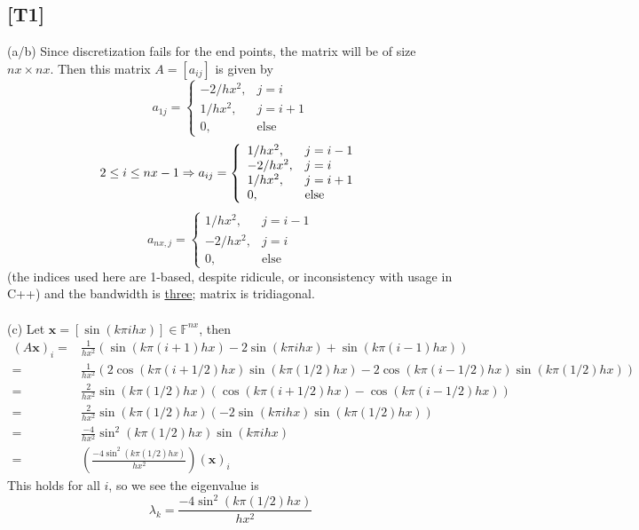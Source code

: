\documentclass[12pt,a4paper]{article}
\newcommand{\ra}[1]{\ifnum #1=1\rightarrow\fi\ifnum #1=2\Rightarrow\fi}
\newcommand{\bga}{\begin{align*}}
\renewcommand{\l}{\left}\renewcommand{\r}{\right}
\newcommand{\x}{\times}
\newcommand{\F}{\mathbb F}
\def\vx{\mathbf x}
\begin{document}
\subsection*{[T1]}
(a/b) Since discretization fails for the end points, the matrix will be of size $nx\x nx$. Then this matrix $A = [a_{ij}]$ is given by 
$$a_{1j} = \l\{\begin{array}{ll}
-2/hx^2, &j=i\\
1/hx^2, &j=i+1\\
0, &\text{else}
\end{array}\r.$$
$$2 \leq i \leq nx-1 \ra2 a_{ij} = \l\{\begin{array}{ll}
1/hx^2, &j=i-1\\
-2/hx^2, &j=i\\
1/hx^2, &j=i+1\\
0, &\text{else}
\end{array}\r.$$
$$a_{nx,j} = \l\{\begin{array}{ll}
1/hx^2, &j=i-1\\
-2/hx^2, &j=i\\
0, &\text{else}
\end{array}\r.$$
(the indices used here are 1-based, despite ridicule, or inconsistency with usage in C++) and the bandwidth is \underline{three}; matrix is tridiagonal. \\
\\
(c) Let $\vx = [\sin(k\pi i hx)] \in \F^{nx}$, then
\bga
(A\vx)_i 
= & \frac1{hx^2}\l(\sin(k\pi (i+1)hx) - 2\sin(k\pi ihx) + \sin(k\pi(i-1)hx)\r)\\
= & \frac1{hx^2 }\l(  2\cos(k\pi (i+1/2) hx)\sin(k\pi (1/2) hx) - 2\cos(k\pi (i-1/2)hx)\sin(k\pi (1/2)hx)  \r)\\
= & \frac2{hx^2}\sin(k\pi(1/2)hx) \l(\cos(k\pi(i+1/2)hx) - \cos(k\pi(i-1/2)hx) \r) \\
= & \frac2{hx^2}\sin(k\pi(1/2)hx)(-2\sin(k\pi i hx)\sin(k\pi (1/2)hx)) \\
= & \frac{-4}{hx^2} \sin^2(k\pi (1/2)hx) \sin(k\pi i hx) \\
= & \l(\frac{-4\sin^2(k\pi (1/2)hx) }{hx^2}\r) (\vx)_i
\end{align*}
This holds for all $i$, so we see the eigenvalue is 
$$\lambda_k = \frac{-4\sin^2(k\pi (1/2)hx) }{hx^2}$$
\end{document}
